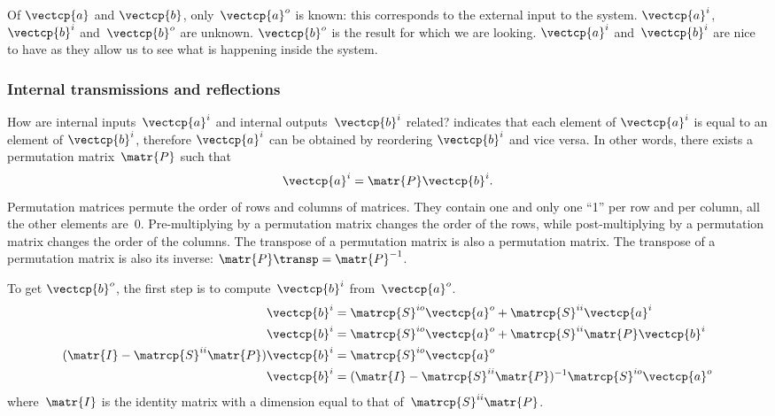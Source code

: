 \begin{refsection}
Of $\vectcp{a}$ and $\vectcp{b}$, only~$\vectcp{a}^o$ is known: this corresponds to the external input to the system.
$\vectcp{a}^i$, $\vectcp{b}^i$ and~$\vectcp{b}^o$ are unknown.
$\vectcp{b}^o$ is the result for which we are looking.
$\vectcp{a}^i$ and~$\vectcp{b}^i$ are nice to have as they allow us to see what is happening inside the system.




\subsubsection{Internal transmissions and reflections}

How are internal inputs~$\vectcp{a}^i$ and internal outputs~$\vectcp{b}^i$ related?
 indicates that each element of $\vectcp{a}^i$ is equal to an element of $\vectcp{b}^i$, therefore $\vectcp{a}^i$ can be obtained by reordering $\vectcp{b}^i$ and vice versa.
In other words, there exists a permutation matrix~$\matr{P}$ such that
\begin{equation}
    \vectcp{a}^i = \matr{P} \vectcp{b}^i \text{.} \label{eq:relation_ai_bi}
\end{equation}
Permutation matrices permute the order of rows and columns of matrices.
They contain one and only one ``1'' per row and per column, all the other elements are~0.
Pre-multiplying by a permutation matrix changes the order of the rows,
while post-multiplying by a permutation matrix changes the order of the columns.
The transpose of a permutation matrix is also a permutation matrix.
The transpose of a permutation matrix is also its inverse: $\matr{P}\transp = \matr{P}^{-1}$.

To get $\vectcp{b}^o$, the first step is to compute~$\vectcp{b}^i$ from~$\vectcp{a}^o$.
\begin{subequations}
    \label{eq:compute_bi}
    \begin{align}
        \vectcp{b}^i
        &=
        \matrcp{S}^{io} \vectcp{a}^o + \matrcp{S}^{ii}\vectcp{a}^i
        \label{eq:compute_bi_ai}
        \\
        \vectcp{b}^i
        &=
        \matrcp{S}^{io} \vectcp{a}^o + \matrcp{S}^{ii} \matr{P} \vectcp{b}^i
        \label{eq:compute_bi_bi}
        \\
        (\matr{I} - \matrcp{S}^{ii}\matr{P}) \vectcp{b}^i
        &=
        \matrcp{S}^{io} \vectcp{a}^o
        \label{eq:compute_bi_solve}
        \\
        \vectcp{b}^i
        &=
        (\matr{I} - \matrcp{S}^{ii} \matr{P})^{-1} \matrcp{S}^{io} \vectcp{a}^o
        \label{eq:compute_bi_invert}
    \end{align}
\end{subequations}
where~$\matr{I}$ is the identity matrix with a dimension equal to that of~$\matrcp{S}^{ii}\matr{P}$.


\end{refsection}
